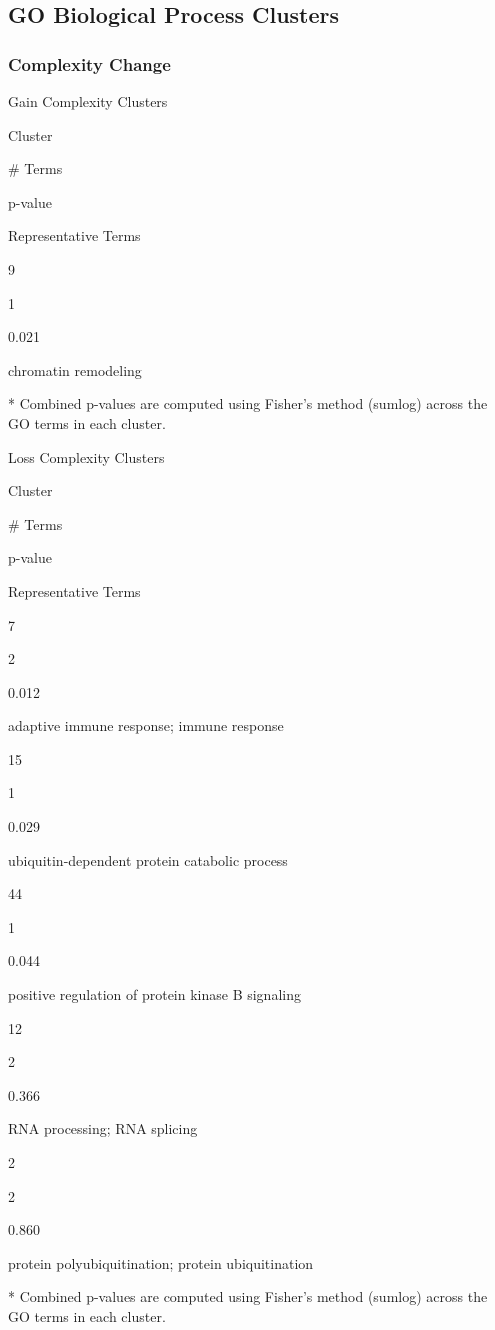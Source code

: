 \documentclass[
  letterpaper,
  DIV=11,
  numbers=noendperiod,
  openany,
  oneside]{scrreprt}
\begin{document}
\subsection{GO Biological Process Clusters}

\subsubsection{Complexity Change}

Gain Complexity Clusters

Cluster

\# Terms

p-value

Representative Terms

9

1

0.021

chromatin remodeling

* Combined p-values are computed using Fisher's method (sumlog) across
the GO terms in each cluster.

Loss Complexity Clusters

Cluster

\# Terms

p-value

Representative Terms

7

2

0.012

adaptive immune response; immune response

15

1

0.029

ubiquitin-dependent protein catabolic process

44

1

0.044

positive regulation of protein kinase B signaling

12

2

0.366

RNA processing; RNA splicing

2

2

0.860

protein polyubiquitination; protein ubiquitination

* Combined p-values are computed using Fisher's method (sumlog) across
the GO terms in each cluster.
\end{document}
